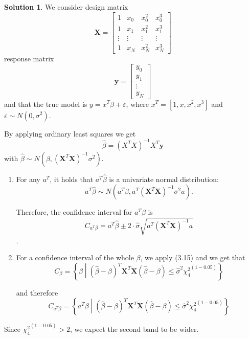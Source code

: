 \documentclass[]{book}
\theoremstyle{definition}
\newtheorem*{soln}{Solution}
\newcommand{\XX}{\mathbf{X}} \newcommand{\YY}{\mathbf{Y}}
\newcommand{\yy}{\mathbf{y}}
\begin{document}
\begin{enumerate}
	\begin{soln}
		We consider design matrix
		\begin{equation}
			\XX = 
			\begin{bmatrix}
				1 & x_0 & x_0^2 & x_0^3 \\
				1 & x_1 & x_1^2 & x_1^3 \\
				\vdots & \vdots & \vdots & \vdots \\
				1 & x_N & x_N^2 & x_N^3
			\end{bmatrix}
		\end{equation}
		response matrix
		\begin{equation}
			\yy =
			\begin{bmatrix}
				y_0 \\
				y_1 \\
				\vdots \\
				y_N
			\end{bmatrix}
		\end{equation}
		and that the true model is $y=x^T\beta+\varepsilon$, where
		$x^T=[1, x, x^2, x^3]$ and $\varepsilon\sim N(0,\sigma^2)$.

		By applying ordinary least squares we get
		\[\hat\beta=(X^TX)^{-1}X^T \yy\]
		with $\hat\beta\sim N(\beta,(\XX^T\XX)^{-1}\sigma^2)$.
		\begin{enumerate}
			\item For
		any $a^T$, it holds that $a^T\hat\beta$ is a univariate normal
		distribution: 
		\[a^T\hat\beta\sim N(a^T\beta,a^T(\XX^T\XX)^{-1}\sigma^2a).\]

		Therefore, the confidence interval for $a^T\beta$ is 
		\[C_{a^T\beta}=a^T\hat\beta\pm 2\cdot\hat\sigma\sqrt{a^T(\XX^T\XX)^{-1}a}\].

			\item For a confidence interval of the whole $\beta$, 
			we apply (3.15) and we get that 
			\[C_{\beta}=\left\{\beta\middle|(\hat\beta-\beta)^T\XX^T\XX(\hat\beta-\beta)\le\hat\sigma^2{\chi_4^2}^{(1-0.05)}\right\}\]
		
			and therefore
			\[C_{a^T\beta}=\left\{a^T\beta\middle|(\hat\beta-\beta)^T\XX^T\XX(\hat\beta-\beta)\le\hat\sigma^2{\chi_4^2}^{(1-0.05)}\right\}\]
		\end{enumerate}

		Since ${\chi_4^2}^{(1-0.05)}>2$, we expect the second band to be
		wider.


\end{soln}
\end{enumerate}
\end{document}
